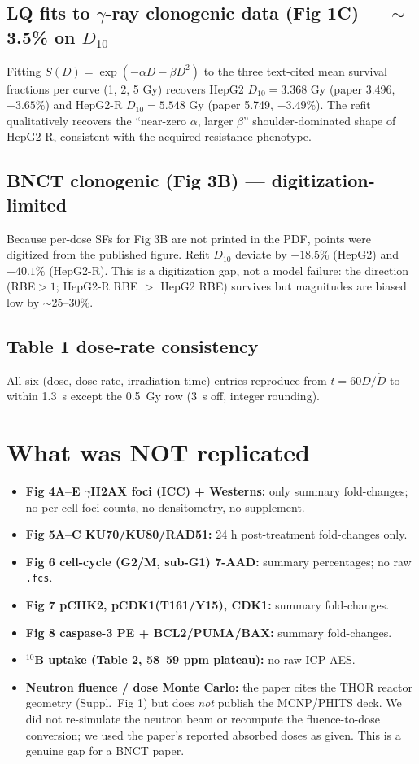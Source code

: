 \documentclass[11pt]{article}
\begin{document}
\subsection{LQ fits to $\gamma$-ray clonogenic data (Fig 1C) --- $\sim$3.5\% on $D_{10}$}
Fitting $S(D) = \exp(-\alpha D - \beta D^{2})$ to the three text-cited mean
survival fractions per curve (1, 2, 5 Gy) recovers HepG2 $D_{10} = 3.368$ Gy
(paper 3.496, $-3.65\%$) and HepG2-R $D_{10} = 5.548$ Gy (paper 5.749, $-3.49\%$).
The refit qualitatively recovers the ``near-zero $\alpha$, larger $\beta$''
shoulder-dominated shape of HepG2-R, consistent with the acquired-resistance
phenotype.

\subsection{BNCT clonogenic (Fig 3B) --- digitization-limited}
Because per-dose SFs for Fig 3B are not printed in the PDF, points were
digitized from the published figure. Refit $D_{10}$ deviate by
$+18.5\%$ (HepG2) and $+40.1\%$ (HepG2-R). This is a digitization gap, not a
model failure: the direction (RBE${}>1$; HepG2-R RBE ${}>$ HepG2 RBE) survives
but magnitudes are biased low by $\sim$25--30\%.

\subsection{Table 1 dose-rate consistency}
All six (dose, dose rate, irradiation time) entries reproduce from
$t = 60D/\dot D$ to within 1.3~s except the 0.5~Gy row (3~s off, integer
rounding).

\section{What was NOT replicated}
\begin{itemize}
  \item \textbf{Fig 4A--E $\gamma$H2AX foci (ICC) + Westerns:} only summary
        fold-changes; no per-cell foci counts, no densitometry, no supplement.
  \item \textbf{Fig 5A--C KU70/KU80/RAD51:} 24 h post-treatment fold-changes only.
  \item \textbf{Fig 6 cell-cycle (G2/M, sub-G1) 7-AAD:} summary percentages;
        no raw \texttt{.fcs}.
  \item \textbf{Fig 7 pCHK2, pCDK1(T161/Y15), CDK1:} summary fold-changes.
  \item \textbf{Fig 8 caspase-3 PE + BCL2/PUMA/BAX:} summary fold-changes.
  \item \textbf{$^{10}$B uptake (Table 2, 58--59 ppm plateau):} no raw ICP-AES.
  \item \textbf{Neutron fluence / dose Monte Carlo:} the paper cites the
        THOR reactor geometry (Suppl.\ Fig 1) but does \emph{not} publish the
        MCNP/PHITS deck. We did not re-simulate the neutron beam or recompute
        the fluence-to-dose conversion; we used the paper's reported absorbed
        doses as given. This is a genuine gap for a BNCT paper.
\end{itemize}
\end{document}
